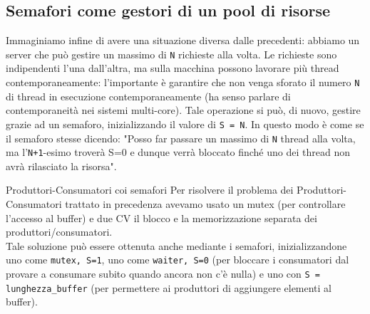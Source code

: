 \documentclass[12pt]{report}
\begin{document}
	\subsection{Semafori come gestori di un pool di risorse}
	Immaginiamo infine di avere una situazione diversa dalle precedenti: abbiamo un server che può gestire un massimo di \texttt{N} richieste alla volta. Le richieste sono indipendenti l'una dall'altra, ma sulla macchina possono lavorare più thread contemporaneamente: l'importante è garantire che non venga sforato il numero \texttt{N} di thread in esecuzione contemporaneamente (ha senso parlare di contemporaneità nei sistemi multi-core). Tale operazione si può, di nuovo, gestire grazie ad un semaforo, inizializzando il valore di \texttt{S = N}. In questo modo è come se il semaforo stesse dicendo: "Posso far passare un massimo di \texttt{N} thread alla volta, ma l'\texttt{N+1}-esimo troverà S=0 e dunque verrà bloccato finché uno dei thread non avrà rilasciato la risorsa".
	
	\begin{osservazione}{Produttori-Consumatori coi semafori}{}
		Per risolvere il problema dei Produttori-Consumatori trattato in precedenza avevamo usato un mutex (per controllare l'accesso al buffer) e due CV il blocco e la memorizzazione separata dei produttori/consumatori.\\
		Tale soluzione può essere ottenuta anche mediante i semafori, inizializzandone uno come \texttt{mutex, S=1}, uno come \texttt{waiter, S=0} (per bloccare i consumatori dal provare a consumare subito quando ancora non c'è nulla) e uno con \texttt{S = lunghezza\_buffer} (per permettere ai produttori di aggiungere elementi al buffer).
	\end{osservazione}
	
\end{document}
